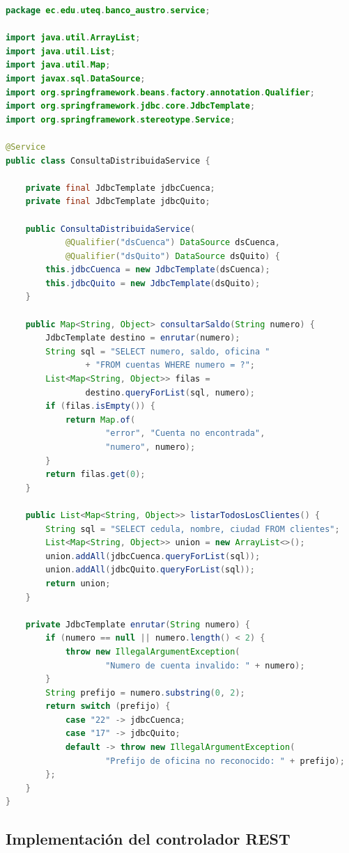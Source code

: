 \documentclass[11pt,a4paper]{article}
\begin{document}
\begin{lstlisting}[language=Java, caption={ConsultaDistribuidaService.java}]
package ec.edu.uteq.banco_austro.service;

import java.util.ArrayList;
import java.util.List;
import java.util.Map;
import javax.sql.DataSource;
import org.springframework.beans.factory.annotation.Qualifier;
import org.springframework.jdbc.core.JdbcTemplate;
import org.springframework.stereotype.Service;

@Service
public class ConsultaDistribuidaService {

    private final JdbcTemplate jdbcCuenca;
    private final JdbcTemplate jdbcQuito;

    public ConsultaDistribuidaService(
            @Qualifier("dsCuenca") DataSource dsCuenca,
            @Qualifier("dsQuito") DataSource dsQuito) {
        this.jdbcCuenca = new JdbcTemplate(dsCuenca);
        this.jdbcQuito = new JdbcTemplate(dsQuito);
    }

    public Map<String, Object> consultarSaldo(String numero) {
        JdbcTemplate destino = enrutar(numero);
        String sql = "SELECT numero, saldo, oficina "
                + "FROM cuentas WHERE numero = ?";
        List<Map<String, Object>> filas =
                destino.queryForList(sql, numero);
        if (filas.isEmpty()) {
            return Map.of(
                    "error", "Cuenta no encontrada",
                    "numero", numero);
        }
        return filas.get(0);
    }

    public List<Map<String, Object>> listarTodosLosClientes() {
        String sql = "SELECT cedula, nombre, ciudad FROM clientes";
        List<Map<String, Object>> union = new ArrayList<>();
        union.addAll(jdbcCuenca.queryForList(sql));
        union.addAll(jdbcQuito.queryForList(sql));
        return union;
    }

    private JdbcTemplate enrutar(String numero) {
        if (numero == null || numero.length() < 2) {
            throw new IllegalArgumentException(
                    "Numero de cuenta invalido: " + numero);
        }
        String prefijo = numero.substring(0, 2);
        return switch (prefijo) {
            case "22" -> jdbcCuenca;
            case "17" -> jdbcQuito;
            default -> throw new IllegalArgumentException(
                    "Prefijo de oficina no reconocido: " + prefijo);
        };
    }
}
\end{lstlisting}

\FloatBarrier
\subsection{Implementación del controlador REST}
\end{document}
